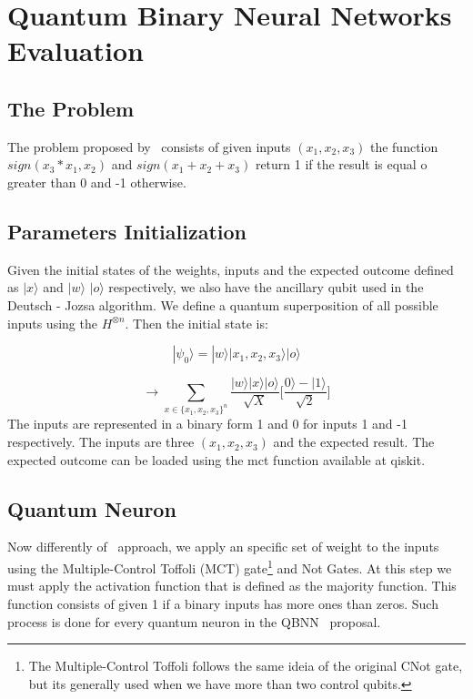 \documentclass[conference]{IEEEtran}
\begin{document}
\section{Quantum Binary Neural Networks Evaluation}\label{sec:quantum-binary-neural-networks-evaluation}

\subsection*{The Problem}\label{subsec:the-problem2}
 The problem proposed by~\cite{fawaz2019training} consists of given inputs \((x_1, x_2, x_3)\) the function
  \(sign(x_3*x_1, x_2)\) and \(sign(x_1 + x_2 + x_3)\) return 1 if the result is equal o greater than 0 and -1 otherwise.

 \subsection{Parameters Initialization}\label{subsec:initializaton}
   Given the initial states of the weights, inputs and the expected outcome defined as $|x\rangle$ and $|w\rangle$
 $|o\rangle$ respectively, we also have the ancillary qubit used in the Deutsch - Jozsa algorithm.
 We define a quantum superposition of all possible inputs using the $H^ {\otimes n}$.
 Then the initial state is:

  \begin{equation}
          |\psi_0\rangle = |w\rangle|x_1, x_2, x_3\rangle|o\rangle
  \end{equation}

  \begin{equation}
          \rightarrow \sum_{x \in \{x_1, x_2, x_3\}^n}
          \frac{|w\rangle|x\rangle|o\rangle}{\sqrt{X}}\Bigg[\frac{0\rangle - |1\rangle}{\sqrt{2}}\Bigg]
  \end{equation}
  The inputs are represented in a binary form 1 and 0 for inputs 1 and -1 respectively.
  The inputs are three  $(x_1, x_2, x_3)$ and the expected result.
  The expected outcome can be loaded using the mct function available at qiskit.

\subsection{Quantum Neuron}\label{subsec:quantum-neuron}
  Now differently of~\cite{fawaz2019training} approach, we apply an specific set of weight to the inputs using the
  Multiple-Control Toffoli (MCT) gate\footnote{The Multiple-Control Toffoli follows the same ideia of the original
  CNot gate, but its generally used when we have more than two control qubits.} and Not Gates.
  At this step we must apply the activation function that is defined as the majority function.
 This function consists of given 1 if a binary inputs has more ones than zeros.
  Such process is done for every quantum neuron in the QBNN~\cite{fawaz2019training} proposal.
\end{document}
